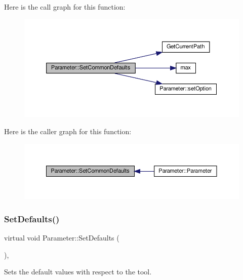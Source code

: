 Here is the call graph for this function\+:
\nopagebreak
\begin{figure}[H]
\begin{center}
\leavevmode
\includegraphics[width=350pt]{dc/dab/classParameter_a75d63915daccef91941cd50a0dd6f2f1_cgraph}
\end{center}
\end{figure}
Here is the caller graph for this function\+:
\nopagebreak
\begin{figure}[H]
\begin{center}
\leavevmode
\includegraphics[width=350pt]{dc/dab/classParameter_a75d63915daccef91941cd50a0dd6f2f1_icgraph}
\end{center}
\end{figure}
\mbox{\label{classParameter_af2bbff2bbfee25d348bd2f0d796d7b3f}} 
\subsubsection{\texorpdfstring{Set\+Defaults()}{SetDefaults()}}
{\footnotesize\ttfamily virtual void Parameter\+::\+Set\+Defaults (\begin{DoxyParamCaption}{ }\end{DoxyParamCaption})\hspace{0.3cm}{\ttfamily [protected]}, {}}



Sets the default values with respect to the tool. 



